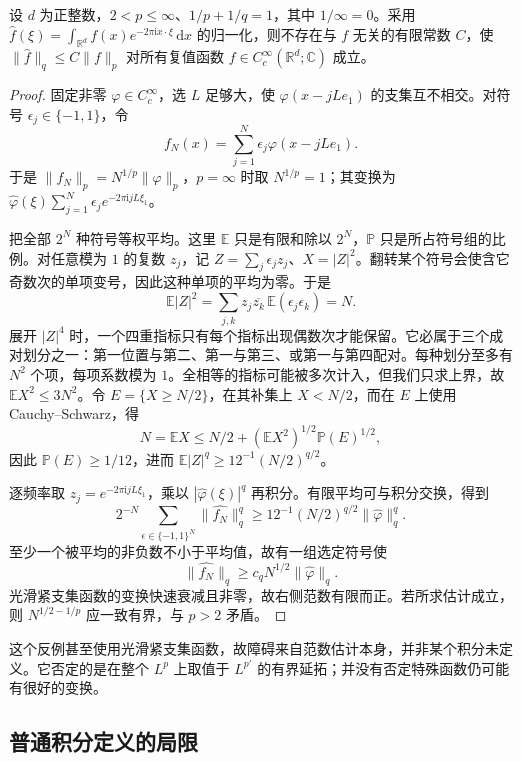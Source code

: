 \begin{theorem}\label{b2:thm:04-p-above-two}
设 \(d\) 为正整数，\(2<p\leq\infty\)、\(1/p+1/q=1\)，其中 \(1/\infty=0\)。采用 \(\widehat f(\xi)=\int_{\mathbb R^d}f(x)e^{-2\pi\mathrm{i}x\cdot\xi}\,\mathrm{d}x\) 的归一化，则不存在与 \(f\) 无关的有限常数 \(C\)，使 \(\|\widehat f\|_q\leq C\|f\|_p\) 对所有复值函数 \(f\in C_c^\infty(\mathbb R^d;\mathbb C)\) 成立。
\end{theorem}
\begin{proof}
固定非零 \(\varphi\in C_c^\infty\)，选 \(L\) 足够大，使 \(\varphi(x-jLe_1)\) 的支集互不相交。对符号 \(\epsilon_j\in\{-1,1\}\)，令
\[
 f_N(x)=\sum_{j=1}^N\epsilon_j\varphi(x-jLe_1).
\]
于是 \(\|f_N\|_p=N^{1/p}\|\varphi\|_p\)，\(p=\infty\) 时取 \(N^{1/p}=1\)；其变换为 \(\widehat\varphi(\xi)\sum_{j=1}^N\epsilon_je^{-2\pi\mathrm{i}jL\xi_1}\)。

把全部 \(2^N\) 种符号等权平均。这里 \(\mathbb E\) 只是有限和除以 \(2^N\)，\(\mathbb P\) 只是所占符号组的比例。对任意模为 \(1\) 的复数 \(z_j\)，记 \(Z=\sum_j\epsilon_jz_j\)、\(X=|Z|^2\)。翻转某个符号会使含它奇数次的单项变号，因此这种单项的平均为零。于是
\[
 \mathbb E|Z|^2=\sum_{j,k}z_j\overline{z_k}\,\mathbb E(\epsilon_j\epsilon_k)=N.
\]
展开 \(|Z|^4\) 时，一个四重指标只有每个指标出现偶数次才能保留。它必属于三个成对划分之一：第一位置与第二、第一与第三、或第一与第四配对。每种划分至多有 \(N^2\) 个项，每项系数模为 \(1\)。全相等的指标可能被多次计入，但我们只求上界，故 \(\mathbb EX^2\leq3N^2\)。令 \(E=\{X\geq N/2\}\)，在其补集上 \(X<N/2\)，而在 \(E\) 上使用 Cauchy--Schwarz，得
\[
 N=\mathbb EX\leq N/2+(\mathbb EX^2)^{1/2}\mathbb P(E)^{1/2},
\]
因此 \(\mathbb P(E)\geq1/12\)，进而 \(\mathbb E|Z|^q\geq12^{-1}(N/2)^{q/2}\)。

逐频率取 \(z_j=e^{-2\pi\mathrm{i}jL\xi_1}\)，乘以 \(|\widehat\varphi(\xi)|^q\) 再积分。有限平均可与积分交换，得到
\[
 2^{-N}\sum_{\epsilon\in\{-1,1\}^N}\|\widehat {f_N}\|_q^q
 \geq12^{-1}(N/2)^{q/2}\|\widehat\varphi\|_q^q.
\]
至少一个被平均的非负数不小于平均值，故有一组选定符号使
\[
 \|\widehat {f_N}\|_q\geq c_qN^{1/2}\|\widehat\varphi\|_q.
\]
光滑紧支集函数的变换快速衰减且非零，故右侧范数有限而正。若所求估计成立，则 \(N^{1/2-1/p}\) 应一致有界，与 \(p>2\) 矛盾。
\end{proof}

这个反例甚至使用光滑紧支集函数，故障碍来自范数估计本身，并非某个积分未定义。它否定的是在整个 \(L^p\) 上取值于 \(L^{p'}\) 的有界延拓；并没有否定特殊函数仍可能有很好的变换。

\subsection{普通积分定义的局限}
\label{b2:subsec:040302}

